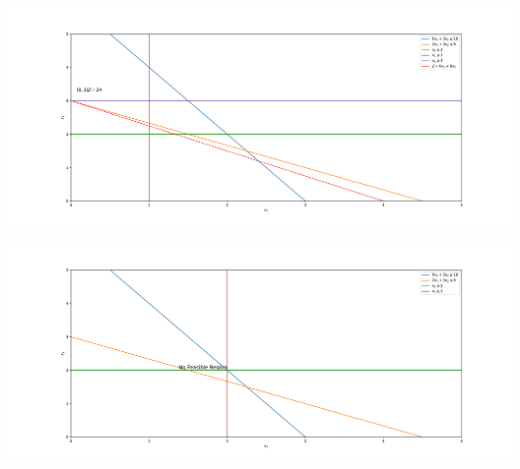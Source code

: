 \begin{center}
    \includegraphics[width = \textwidth]{Exercice/PY/EX1/ex1.8.pdf}
\end{center}
\begin{center}
    \includegraphics[width = \textwidth]{Exercice/PY/EX1/ex1.9.pdf}
\end{center}



